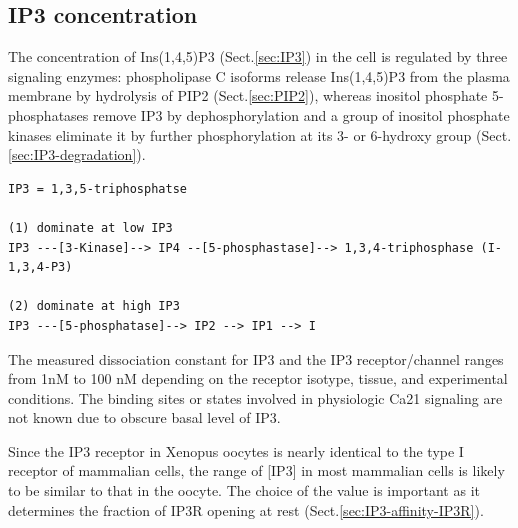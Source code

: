  
% 




\subsection{IP3 concentration}
\label{sec:IP3-concentration}

The concentration of Ins(1,4,5)P3 (Sect.\ref{sec:IP3}) in the cell is regulated
by three signaling enzymes: phospholipase C isoforms release Ins(1,4,5)P3 from
the plasma membrane by hydrolysis of PIP2 (Sect.\ref{sec:PIP2}), whereas
inositol phosphate 5-phosphatases remove IP3 by dephosphorylation and a group of
inositol phosphate kinases eliminate it by further phosphorylation at its 3- or
6-hydroxy group (Sect.\ref{sec:IP3-degradation}).
\begin{verbatim}
IP3 = 1,3,5-triphosphatse

(1) dominate at low IP3
IP3 ---[3-Kinase]--> IP4 --[5-phosphastase]--> 1,3,4-triphosphase (I-1,3,4-P3)

(2) dominate at high IP3
IP3 ---[5-phosphatase]--> IP2 --> IP1 --> I
\end{verbatim}

The measured dissociation constant for IP3 and the IP3 receptor/channel ranges
from 1nM to 100 nM depending on the receptor isotype, tissue, and
experimental conditions.
The binding sites or states involved in physiologic Ca21 signaling are not
known due to obscure basal level of IP3.

Since the IP3 receptor in Xenopus oocytes is nearly identical to the type I
receptor of mammalian cells, the range of [IP3] in most mammalian cells is
likely to be similar to that in the oocyte. The choice of the value is important
as it determines the fraction of IP3R opening at rest
(Sect.\ref{sec:IP3-affinity-IP3R}).


